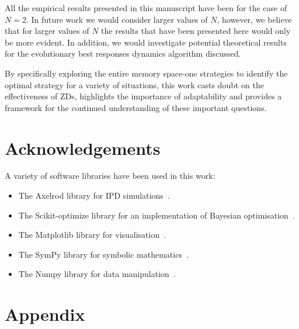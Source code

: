 \documentclass[10pt]{article}
\begin{document}
All the empirical results presented in this manuscript have been for the case of
$N=2$. In future work we would consider larger values of $N$, however, we
believe that for larger values of $N$ the results that have been presented here
would only be more evident. In addition, we would investigate potential
theoretical results for the evolutionary best responses dynamics algorithm
discussed.

By specifically exploring the entire memory space-one strategies to identify
the optimal strategy for a variety of situations, this work casts doubt
on the effectiveness of ZDs, highlights the importance of adaptability and provides
a framework for the continued understanding of these important questions.

\section{Acknowledgements}

A variety of software libraries have been used in this work:

\begin{itemize}
    \item The Axelrod library for IPD simulations~\cite{axelrodproject}.
    \item The Scikit-optimize library for an implementation of Bayesian optimisation~\cite{tim_head_2018_1207017}.
    \item The Matplotlib library for visualisation~\cite{hunter2007matplotlib}.
    \item The SymPy library for symbolic mathematics~\cite{sympy}.
    \item The Numpy library for data manipulation~\cite{walt2011numpy}.
\end{itemize}




\section{Appendix}
\end{document}
